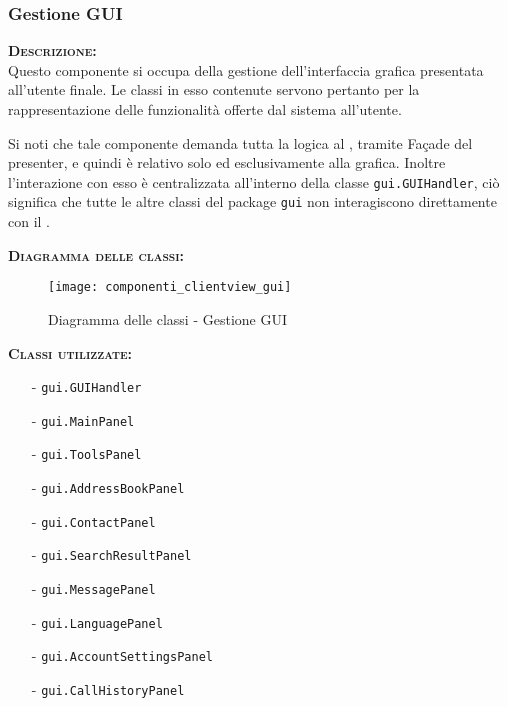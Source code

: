 \subsubsection{Gestione GUI}
\begin{description}
	\item{\scshape\bfseries Descrizione:}\\
Questo componente si occupa della gestione dell'interfaccia grafica presentata all'utente finale. Le classi in esso contenute servono pertanto per la rappresentazione delle funzionalità offerte dal sistema all'utente.

Si noti che tale componente demanda tutta la logica al , tramite Façade del presenter, e quindi è relativo solo ed esclusivamente alla grafica. Inoltre l'interazione con esso è centralizzata all'interno della classe \texttt{gui.GUIHandler}, ciò significa che tutte le altre classi del package \texttt{gui} non interagiscono direttamente con il .
	\item{\scshape\bfseries Diagramma delle classi:}
	
\begin{figure}[H]
\begin{center}
\texttt{[image: componenti\_clientview\_gui]}
\caption{Diagramma delle classi - Gestione GUI}\label{fig:gestione_gui}
\end{center}
\end{figure}	
	
	\item{\scshape\bfseries Classi utilizzate:} 
	\begin{itemize}[noitemsep,nolistsep]
		\item[-] \texttt{gui.GUIHandler}
		\item[-] \texttt{gui.MainPanel}
		\item[-] \texttt{gui.ToolsPanel}
		\item[-] \texttt{gui.AddressBookPanel}
		\item[-] \texttt{gui.ContactPanel}
		\item[-] \texttt{gui.SearchResultPanel}
		\item[-] \texttt{gui.MessagePanel}
		\item[-] \texttt{gui.LanguagePanel}
		\item[-] \texttt{gui.AccountSettingsPanel}
		\item[-] \texttt{gui.CallHistoryPanel}
	\end{itemize}  
\end{description}

